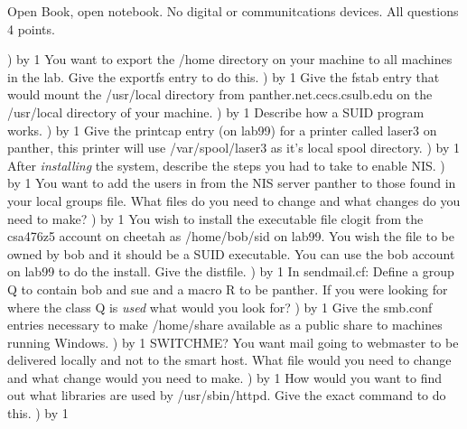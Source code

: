 
\parindent=0in
\nopagenumbers
\newcount\quesno
{}
\def\ques{\number\quesno) \advance\quesno by 1}
\def\aspace{\vskip 1.5in}

Open Book, open notebook. No digital or communitcations devices.
All questions 4 points.

\ques
You want to export the
{\ltt{}/home} directory on your machine to all machines in the lab.
Give the {\ltt{}exportfs} entry to do this.
\vskip 0.8in
\ques
Give the {\ltt{}fstab} entry that would mount
the {\ltt{}/usr/local} directory from {\ltt{}panther.net.cecs.csulb.edu}
on the {\ltt{}/usr/local} directory of your machine.
\vskip 0.7in
\ques
Describe how a SUID program works.
\vskip 2.4in
\ques
Give the {\ltt{}printcap} entry (on {\ltt{}lab99})
for a printer called {\ltt{}laser3}
on {\ltt{}panther}, this printer will use {\ltt{}/var/spool/laser3}
as it's local spool directory.
\vskip 0.8in
\ques
After {\it installing} the system, describe the steps you had to take
to enable NIS.
\vskip 2.4in
\vfill\eject
\ques
You want to add the users in from the NIS server {\ltt{}panther}
to those found in your local groups file.
What files do you need to change and what changes do you need to make?
\vskip 1.7in
\ques
You wish to install the executable file {\ltt{}clogit}
from the {\ltt{}csa476z5} account on {\ltt{}cheetah} as
{\ltt{}/home/bob/sid} on {\ltt{}lab99}.
You wish the file to be owned by {\ltt{}bob} and it should be a SUID
executable. You can use the {\ltt{}bob} account on {\ltt{}lab99}
to do the install.
Give the {\ltt{}distfile}.
\vskip 1.4in
\ques
In {\ltt{}sendmail.cf}:
Define a group {\ltt{}Q} to contain {\ltt{}bob} and {\ltt{}sue}
and a macro {\ltt{}R} to be {\ltt{}panther}.
If you were looking for where the class Q is {\it used} what would you look for?
\vskip 1.6in
\ques
Give the {\ltt{}smb.conf} entries necessary to make
{\ltt{}/home/share} available as a public share to
machines running Windows.
\vskip 1.5in
\vfill\eject
\ques
SWITCHME?
You want mail going to {\ltt{}webmaster} to be delivered locally
and not to the smart host.
What file would you need to change and what change would you need to make.
\vskip 1.0in
\ques
How would you want to find out what libraries are used by
{\ltt{}/usr/sbin/httpd}. Give the exact command to do this.
\vskip 0.7in
\ques

